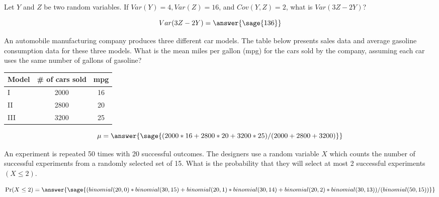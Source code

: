 \documentclass{ximera}
\begin{document}
\begin{problem}
Let $Y$ and $Z$ be two random variables. If $Var(Y) = 4, Var(Z) = 16 $, and $Cov(Y,Z) = 2$, what is $Var(3Z-2Y)$?

\begin{prompt}
$$
Var(3Z-2Y)=\answer{\sage{136}}
$$
\end{prompt}

\end{problem}

\begin{problem}
An automobile manufacturing company produces three different car models. The table below presents sales data and average gasoline consumption data for these three models. What is the mean miles per gallon (mpg) for the cars sold by the company, assuming each car uses the same number of gallons of gasoline?

\begin{tabular}[hc]{l|c|c}
Model & \# of cars sold & mpg \\
\hline
I & 2000 & 16 \\
\hline
II & 2800 & 20 \\
\hline
III & 3200 & 25 \\
\end{tabular}
\begin{prompt}
$$
\mu=\answer{\sage{(2000*16+2800*20+3200*25)/(2000+2800+3200)}}
$$
\end{prompt}

\end{problem}

\begin{problem}
An experiment is repeated 50 times with 20 successful outcomes. The designers use a random variable $X$ which counts the number of successful experiments from a randomly selected set of 15. What is the probability that they will select at most 2 successful experiments $(X\leq 2)$.  
\begin{prompt}
$$
\Pr(X\leq 2)=\answer{\sage{(binomial(20,0)*binomial(30,15)+binomial(20,1)*binomial(30,14)+binomial(20,2)*binomial(30,13))/(binomial(50,15))}}
$$
\end{prompt}

\end{problem}
\end{document}
